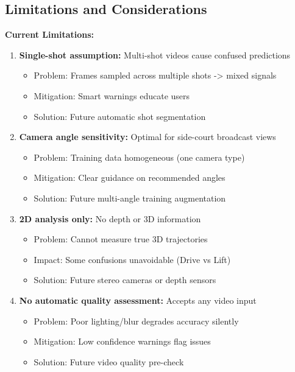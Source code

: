 \documentclass[11pt,a4paper]{article}
\begin{document}
\subsection{Limitations and Considerations}

\textbf{Current Limitations:}

\begin{enumerate}
\item \textbf{Single-shot assumption:} Multi-shot videos cause confused predictions
   \begin{itemize}
   \item Problem: Frames sampled across multiple shots -> mixed signals
   \item Mitigation: Smart warnings educate users
   \item Solution: Future automatic shot segmentation
   \end{itemize}

\item \textbf{Camera angle sensitivity:} Optimal for side-court broadcast views
   \begin{itemize}
   \item Problem: Training data homogeneous (one camera type)
   \item Mitigation: Clear guidance on recommended angles
   \item Solution: Future multi-angle training augmentation
   \end{itemize}

\item \textbf{2D analysis only:} No depth or 3D information
   \begin{itemize}
   \item Problem: Cannot measure true 3D trajectories
   \item Impact: Some confusions unavoidable (Drive vs Lift)
   \item Solution: Future stereo cameras or depth sensors
   \end{itemize}

\item \textbf{No automatic quality assessment:} Accepts any video input
   \begin{itemize}
   \item Problem: Poor lighting/blur degrades accuracy silently
   \item Mitigation: Low confidence warnings flag issues
   \item Solution: Future video quality pre-check
   \end{itemize}
\end{enumerate}
\end{document}
